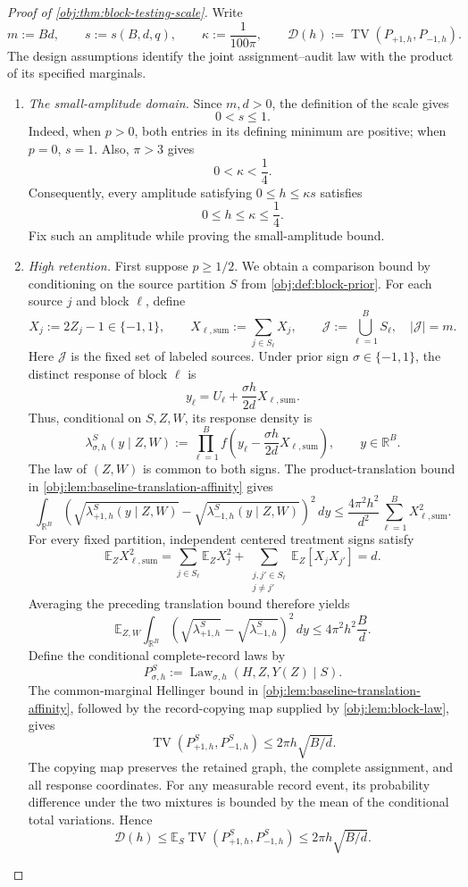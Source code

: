 \documentclass[11pt]{article}
\begin{document}
\begin{proof}[Proof of \cref{obj:thm:block-testing-scale}]
Write
\[
m:=Bd,\qquad s:=s(B,d,q),\qquad
\kappa:=\frac1{100\pi},\qquad
\mathcal D(h):=\operatorname{TV}(P_{+1,h},P_{-1,h}).
\]
The design assumptions identify the joint assignment--audit law with the product of its specified marginals.

\begin{enumerate}
\item \textit{The small-amplitude domain.}
Since \(m,d>0\), the definition of the scale gives
\[
0<s\le1.
\]
Indeed, when \(p>0\), both entries in its defining minimum are positive; when \(p=0\), \(s=1\). Also, \(\pi>3\) gives
\[
0<\kappa<\frac14.
\]
Consequently, every amplitude satisfying \(0\le h\le\kappa s\) satisfies
\[
0\le h\le\kappa\le\frac14.
\]
Fix such an amplitude while proving the small-amplitude bound.

\item \textit{High retention.}
First suppose \(p\ge1/2\). We obtain a comparison bound by conditioning on the source partition \(S\) from \cref{obj:def:block-prior}. For each source \(j\) and block \(\ell\), define
\[
X_j:=2Z_j-1\in\{-1,1\},
\qquad
X_{\ell,\mathrm{sum}}:=\sum_{j\in S_\ell}X_j,
\qquad
\mathcal J:=\bigcup_{\ell=1}^{B}S_\ell,
\quad |\mathcal J|=m.
\]
Here \(\mathcal J\) is the fixed set of labeled sources. Under prior sign \(\sigma\in\{-1,1\}\), the distinct response of block \(\ell\) is
\[
y_\ell=U_\ell+\frac{\sigma h}{2d}X_{\ell,\mathrm{sum}}.
\]
Thus, conditional on \(S,Z,W\), its response density is
\[
\lambda^S_{\sigma,h}(y\mid Z,W)
:=
\prod_{\ell=1}^{B}
f\!\left(y_\ell-\frac{\sigma h}{2d}X_{\ell,\mathrm{sum}}\right),
\qquad y\in\mathbb R^B.
\]
The law of \((Z,W)\) is common to both signs. The product-translation bound in
\cref{obj:lem:baseline-translation-affinity} gives
\[
\int_{\mathbb R^B}
\left(
\sqrt{\lambda^S_{+1,h}(y\mid Z,W)}
-\sqrt{\lambda^S_{-1,h}(y\mid Z,W)}
\right)^2\,dy
\le
\frac{4\pi^2h^2}{d^2}
\sum_{\ell=1}^{B}X_{\ell,\mathrm{sum}}^2.
\]
For every fixed partition, independent centered treatment signs satisfy
\[
\mathbb E_Z X_{\ell,\mathrm{sum}}^2
=
\sum_{j\in S_\ell}\mathbb E_Z X_j^2
+
\sum_{\substack{j,j'\in S_\ell\\j\ne j'}}
\mathbb E_Z[X_jX_{j'}]
=d.
\]
Averaging the preceding translation bound therefore yields
\[
\mathbb E_{Z,W}\!
\int_{\mathbb R^B}
\left(
\sqrt{\lambda^S_{+1,h}}
-\sqrt{\lambda^S_{-1,h}}
\right)^2\,dy
\le 4\pi^2h^2\frac Bd.
\]
Define the conditional complete-record laws by
\[
P^S_{\sigma,h}:=\operatorname{Law}_{\sigma,h}(H,Z,Y(Z)\mid S).
\]
The common-marginal Hellinger bound in
\cref{obj:lem:baseline-translation-affinity}, followed by the record-copying map supplied by
\cref{obj:lem:block-law}, gives
\[
\operatorname{TV}(P^S_{+1,h},P^S_{-1,h})
\le 2\pi h\sqrt{B/d}.
\]
The copying map preserves the retained graph, the complete assignment, and all response coordinates. For any measurable record event, its probability difference under the two mixtures is bounded by the mean of the conditional total variations. Hence
\[
\mathcal D(h)
\le
\mathbb E_S\operatorname{TV}(P^S_{+1,h},P^S_{-1,h})
\le 2\pi h\sqrt{B/d}.
\]


\end{enumerate}
\end{proof}
\end{document}
